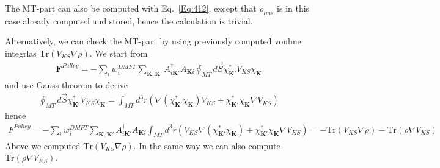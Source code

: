 \documentclass[aps,prb,floatfix,epsfig,singlecolumn,showpacs,preprintnumbers]{revtex4}
\newcommand{\vR}{{\mathbf{R}}}
\newcommand{\vF}{{\mathbf{F}}}
\renewcommand{\vr}{{\mathbf{r}}}
\newcommand{\vK}{{\mathbf{K}}}
\newcommand{\vG}{{\mathbf{G}}}
\newcommand{\Tr}{\mathrm{Tr}}
\begin{document}
% 
% 

The MT-part can also be computed with Eq.~\ref{Eq:412}, except that
$\rho_{lms}$ is in this case already computed and stored, hence the
calculation is trivial.

Alternatively, we can check the MT-part by using previously computed
voulme integrlas $\Tr(V_{KS}\nabla\rho)$. We
start from
\begin{eqnarray}
\vF^{Pulley}=-\sum_i w_i^{DMFT}\sum_{\vK,\vK'} A^\dagger_{i\vK'} A_{\vK i} \oint_{MT}d\vec{S}\chi_{\vK'}^* V_{KS}\chi_{\vK} 
\end{eqnarray}
and use Gauss theorem to derive
\begin{eqnarray}
\oint_{MT}d\vec{S}\chi_{\vK'}^* V_{KS}\chi_{\vK}  = \int_{MT} d^3r  \left(\nabla(\chi^*_{\vK'}\chi_{\vK}) V_{KS} + \chi^*_{\vK'}\chi_{\vK} \nabla V_{KS} \right)
\end{eqnarray}
hence
\begin{eqnarray}
F^{Pulley}=-\sum_i w_i^{DMFT}\sum_{\vK,\vK'} A^\dagger_{i\vK'} A_{\vK i} \int_{MT} d^3r  \left(V_{KS}\nabla(\chi^*_{\vK'}\chi_{\vK})  + \chi^*_{\vK'}\chi_{\vK} \nabla V_{KS} \right)=
-\Tr(V_{KS}\nabla \rho)-\Tr(\rho \nabla V_{KS})
\end{eqnarray}
Above we computed $\Tr(V_{KS}\nabla \rho)$. In the same way we can
also compute $\Tr(\rho \nabla V_{KS})$.
\end{document}
